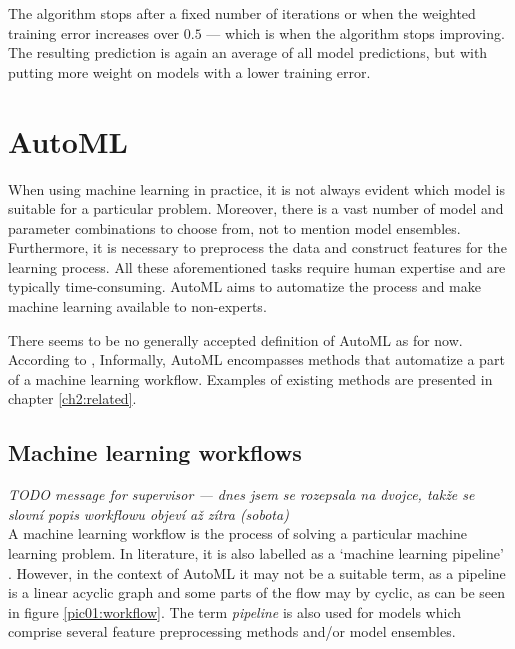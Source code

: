 The algorithm stops after a fixed number of iterations or when the weighted
training error increases over $0.5$ --- which is when the algorithm stops
improving. The resulting prediction is again an average of all model
predictions, but with putting more weight on models with a lower training
error. \citep[335]{Flach:2012:MLA:2490546}

\section{AutoML}
When using machine learning in practice, it is not always evident which model
is suitable for a particular problem. Moreover, there is a vast number of model
and parameter combinations to choose from, not to mention model ensembles.
Furthermore, it is necessary to preprocess the data and construct features
for the learning process. All these aforementioned tasks require human 
expertise and are typically time-consuming. AutoML aims to automatize the
process and make machine learning available to non-experts.

There seems to be no generally accepted definition of AutoML as for now.
According to \cite{DBLP:journals/corr/abs-1810-13306},
Informally, AutoML encompasses methods that automatize a part of a machine
learning workflow. Examples of existing methods are presented in chapter
\ref{ch2:related}.

\subsection{Machine learning workflows}
\textit{TODO message for supervisor --- dnes jsem se rozepsala na dvojce,
takže se slovní popis workflowu objeví až zítra (sobota)}\\

A machine learning workflow is the process of solving a particular machine
learning problem. In literature, it is also labelled as a `machine learning
pipeline' \cite{DBLP:journals/corr/abs-1810-13306}. However, in the context
of AutoML it may not be a suitable term, as a pipeline is a linear acyclic
graph and some parts of the flow may by cyclic, as can be seen
in figure \ref{pic01:workflow}. The term \emph{pipeline} is also used for
models which comprise several feature preprocessing methods and/or model
ensembles. %

